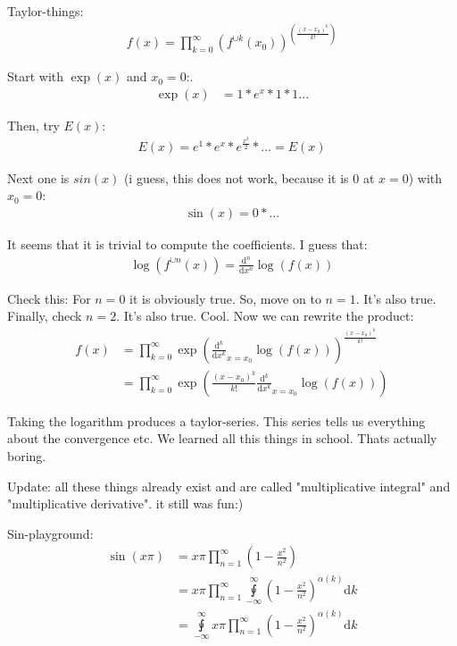 \documentclass{article}
\begin{document}
Taylor-things:
\begin{align}
    f(x)=\prod\limits_{k=0}^\infty \left(f^{\cup k}(x_0)\right)^{\left(\frac{(x-x_0)^k}{k!}\right)}
\end{align}

Start with $\exp(x)$ and $x_0=0$:.
\begin{align}
    \exp(x)&=1*e^x*1*1...
\end{align}

Then, try $E(x)$:
\begin{align}
    E(x)=e^{1}*e^{x}*e^{\frac{x^2}{2}}*...=E(x)
\end{align}

Next one is $sin(x)$ (i guess, this does not work, because it is $0$ at $x=0$) with $x_0=0$:
\begin{align}
    \sin(x)=0*...
\end{align}

It seems that it is trivial to compute the coefficients. I guess that:
\begin{align}
    \log(f^{\cup n}(x)) = \frac{\mathrm{d}^n}{\mathrm{d}x^n}\log(f(x))
\end{align}

Check this: For $n=0$ it is obviously true. So, move on to $n=1$. It's also true. Finally, check $n=2$. It's also true. Cool. Now we can rewrite the product:
\begin{align}
    f(x)&=\prod\limits_{k=0}^\infty \exp\left(\frac{\mathrm{d}^k}{\mathrm{d}x^k}_{x=x_0}\log(f(x))\right)^{\frac{(x-x_0)^k}{k!}}\\
    &=\prod\limits_{k=0}^\infty\exp\left(\frac{(x-x_0)^k}{k!}\frac{\mathrm{d}^k}{\mathrm{d}x^k}_{x=x_0}\log(f(x))\right)
\end{align}

Taking the logarithm produces a taylor-series. This series tells us everything about the convergence etc. We learned all this things in school. Thats actually boring.

Update: all these things already exist and are called "multiplicative integral" and "multiplicative derivative". it still was fun:)

Sin-playground:
\begin{align}
    \sin(x\pi)&=x\pi\prod\limits_{n=1}^\infty\left(1-\frac{x^2}{n^2}\right) \\
    &=x\pi\prod\limits_{n=1}^\infty\intcup\limits_{-\infty}^{\infty}\left(1-\frac{x^2}{n^2}\right)^{\alpha(k)}\mathrm{d}k\\
    &=\intcup\limits_{-\infty}^{\infty}x\pi\prod\limits_{n=1}^\infty\left(1-\frac{x^2}{n^2}\right)^{\alpha(k)}\mathrm{d}k
\end{align}
\end{document}
